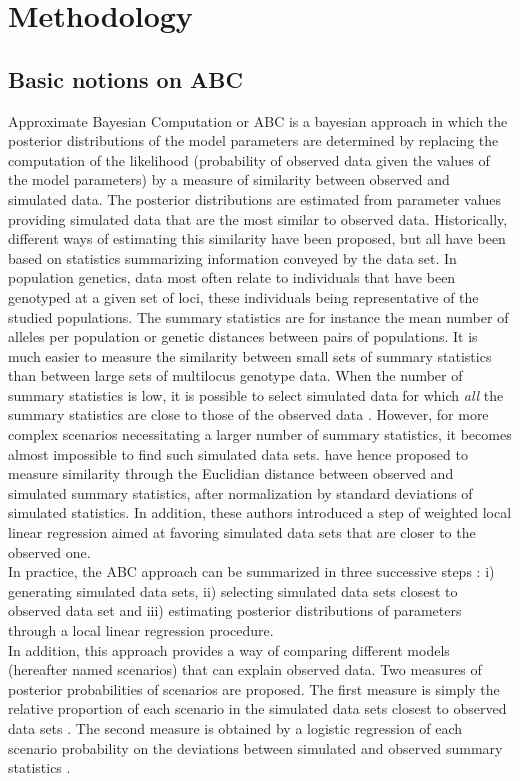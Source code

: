 
\section{Methodology}


\subsection{Basic notions on ABC}

Approximate Bayesian Computation or ABC is a bayesian approach in
which the posterior distributions of the model parameters are determined
by replacing the computation of the likelihood (probability of observed
data given the values of the model parameters) by a measure of similarity
between observed and simulated data. The posterior distributions are
estimated from parameter values providing simulated data that are
the most similar to observed data. Historically, different ways of
estimating this similarity have been proposed, but all have been based
on statistics summarizing information conveyed by the data set. In
population genetics, data most often relate to individuals that have
been genotyped at a given set of loci, these individuals being representative
of the studied populations. The summary statistics are for instance
the mean number of alleles per population or genetic distances between
pairs of populations. It is much easier to measure the similarity
between small sets of summary statistics than between large sets of
multilocus genotype data. When the number of summary statistics is
low, it is possible to select simulated data for which \emph{all}
the summary statistics are close to those of the observed data \citep{P1999,E2001,EC2003}.
However, for more complex scenarios necessitating a larger number
of summary statistics, it becomes almost impossible to find such simulated
data sets. \citet{B2002} have hence proposed to measure similarity
through the Euclidian distance between observed and simulated summary
statistics, after normalization by standard deviations of simulated
statistics. In addition, these authors introduced a step of weighted
local linear regression aimed at favoring simulated data sets that
are closer to the observed one.\\
 In practice, the ABC approach can be summarized in three successive
steps \citep{Ex2005} : i) generating simulated data sets, ii) selecting
simulated data sets closest to observed data set and iii) estimating
posterior distributions of parameters through a local linear regression
procedure.\\
 In addition, this approach provides a way of comparing different
models (hereafter named scenarios) that can explain observed data.
Two measures of posterior probabilities of scenarios are proposed.
The first measure is simply the relative proportion of each scenario
in the simulated data sets closest to observed data sets \citep{ME2005,PC2007}.
The second measure is obtained by a logistic regression of each scenario
probability on the deviations between simulated and observed summary
statistics \citep{FR2007,B2008}. \\


